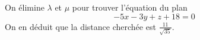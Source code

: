 On élimine $\lambda$ et $\mu$ pour trouver l'équation du plan 
\begin{displaymath}
 -5x-3y+z+18 = 0
\end{displaymath}
On en déduit que la distance cherchée est $\frac{11}{\sqrt{35}}$. 